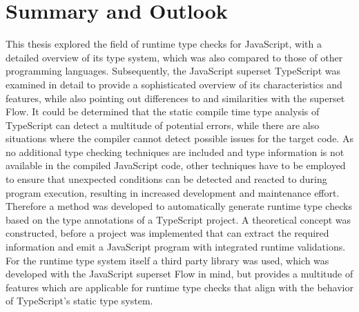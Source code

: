 \chapter{Summary and Outlook}
\label{cha:summary_outlook}

This thesis explored the field of runtime type checks for JavaScript, with a detailed overview of its type system, which was also compared to those of other programming languages. Subsequently, the JavaScript superset TypeScript was examined in detail to provide a sophisticated overview of its characteristics and features, while also pointing out differences to and similarities with the superset Flow. It could be determined that the static compile time type analysis of TypeScript can detect a multitude of potential errors, while there are also situations where the compiler cannot detect possible issues for the target code. As no additional type checking techniques are included and type information is not available in the compiled JavaScript code, other techniques have to be employed to ensure that unexpected conditions can be detected and reacted to during program execution, resulting in increased development and maintenance effort. Therefore a method was developed to automatically generate runtime type checks based on the type annotations of a TypeScript project. A theoretical concept was constructed, before a project was implemented that can extract the required information and emit a JavaScript program with integrated runtime validations. For the runtime type system itself a third party library was used, which was developed with the JavaScript superset Flow in mind, but provides a multitude of features which are applicable for runtime type checks that align with the behavior of TypeScript's static type system.

